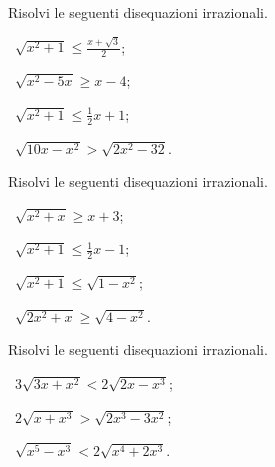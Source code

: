 \begin{esercizio}[\Ast]
 \label{ese:8.22}
Risolvi le seguenti disequazioni irrazionali.
\begin{multicols}{2}
 \begin{enumeratea}
 \item~$\sqrt{x^2+1}\le \frac{x+\sqrt 3} 2$;
 \item~$\sqrt{x^2-5x}\ge x-4$;
 \item~$\sqrt{x^2+1}\le \frac 1 2x+1$;
 \item~$\sqrt{10x-x^2}>\sqrt{2x^2-32}$.
 \end{enumeratea}
 \end{multicols}
\end{esercizio}

\begin{esercizio}[\Ast]
 \label{ese:8.23}
Risolvi le seguenti disequazioni irrazionali.
\begin{multicols}{2}
 \begin{enumeratea}
 \item~$\sqrt{x^2+x}\ge x+3$;
 \item~$\sqrt{x^2+1}\le \frac 1 2x-1$;
 \item~$\sqrt{x^2+1}\le \sqrt{1-x^2}$;
 \item~$\sqrt{2x^2+x}\ge \sqrt{4-x^2}$.
 \end{enumeratea}
 \end{multicols}
\end{esercizio}

\begin{esercizio}[\Ast]
 \label{ese:8.24}
Risolvi le seguenti disequazioni irrazionali.
\begin{multicols}{2}
 \begin{enumeratea}
 \item~$3\sqrt{3x+x^2}<2\sqrt{2x-x^3}$;
 \item~$2\sqrt{x+x^3}>\sqrt{2x^3-3x^2}$;
 \item~$\sqrt{x^5-x^3}<2\sqrt{x^4+2x^3}$.
 \end{enumeratea}
 \end{multicols}
\end{esercizio}
\pagebreak
